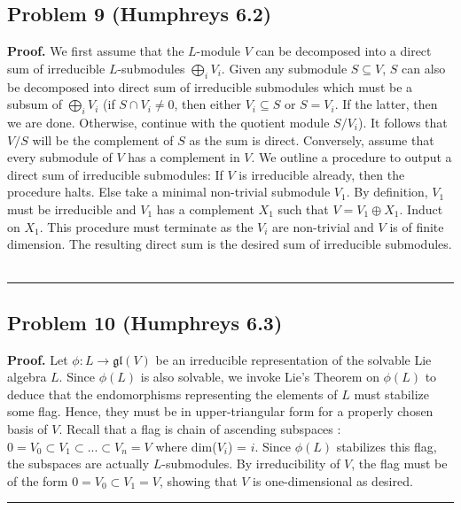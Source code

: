 \documentclass[12pt]{article}%
\newenvironment{proof}[1][Proof]{\textbf{#1.} }{\ \rule{0.5em}{0.5em}}
\begin{document}
\subsection*{Problem 9 (Humphreys 6.2)}
\begin{proof}
  We first assume that the $L$-module $V$ can be decomposed into a direct sum of irreducible $L$-submodules $\bigoplus_i V_i$. Given any submodule $S \subseteq V$, $S$ can also be decomposed into direct sum of irreducible submodules which must be a subsum of $\bigoplus_i V_i$ (if $S \cap V_i \neq 0$, then either $V_i \subseteq S$ or $S  = V_i$. If the latter, then we are done. Otherwise, continue with the quotient module $S/V_i$). It follows that $V/S$ will be the complement of $S$ as the sum is direct. Conversely, assume that every submodule of $V$ has a complement in $V$. We outline a procedure to output a direct sum of irreducible submodules: If $V$ is irreducible already, then the procedure halts. Else take a minimal non-trivial submodule $V_1$. By definition, $V_1$ must be irreducible and $V_1$ has a complement $X_1$ such that $V = V_1 \oplus X_1$. Induct on $X_1$. This procedure must terminate as the $V_i$ are non-trivial and $V$ is of finite dimension. The resulting direct sum is the desired sum of irreducible submodules.
\end{proof}

\subsection*{Problem 10 (Humphreys 6.3)}
\begin{proof}
  Let $\phi: L \rightarrow \mathfrak{gl}(V)$ be an irreducible representation of the solvable Lie algebra $L$. Since $\phi(L)$ is also solvable, we invoke Lie's Theorem on $\phi(L)$ to deduce that the endomorphisms representing the elements of $L$ must stabilize some flag. Hence, they must be in upper-triangular form for a properly chosen basis of $V$. Recall that a flag is chain of ascending subspaces : $0 = V_0 \subset V_1 \subset ... \subset V_n = V $ where dim($V_i$) = $i$. Since $\phi(L)$ stabilizes this flag, the subspaces are actually $L$-submodules. By irreducibility of $V$, the flag must be of the form $ 0 = V_0 \subset V_1 = V$, showing that $V$ is one-dimensional as desired.
\end{proof}
\end{document}
